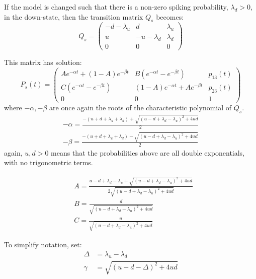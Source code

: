 If the model is changed such that there is a non-zero spiking probability, $\lambda_d>0$, in the down-state, then the transition matrix $Q_s$ becomes:
\begin{equation}
Q_s = \begin{pmatrix} -d-\lambda_u & d & \lambda_u \\ u & -u-\lambda_d & \lambda_d \\ 0 & 0 & 0 \end{pmatrix}
\end{equation}

This matrix has solution:
\begin{equation}
P_s(t) =
\begin{pmatrix}
Ae^{-\alpha t} + (1-A)e^{-\beta t} & B\left(e^{-\alpha t} - e^{-\beta t}\right) & p_{13}(t) \\
C\left(e^{-\alpha t} - e^{-\beta t}\right) & (1-A)e^{-\alpha t} + Ae^{-\beta t} & p_{23}(t)\\
0 & 0 & 1
\end{pmatrix}
\end{equation}
where $-\alpha,-\beta$ are once again the roots of the characteristic polynomial of $Q_s$.
\begin{equation}
\begin{split}
-\alpha = \frac{-(u+d+\lambda_u+\lambda_d) + \sqrt{(u-d+\lambda_d-\lambda_u)^2+4ud}}{2}\\
-\beta = \frac{-(u+d+\lambda_u+\lambda_d) - \sqrt{(u-d+\lambda_d-\lambda_u)^2+4ud}}{2}
\end{split}
\end{equation}
again, $u,d>0$ means that the probabilities above are all double exponentials, with no trigonometric terms.

\begin{equation}
\begin{split}
& A = \frac{u-d+\lambda_d-\lambda_u + \sqrt{(u-d+\lambda_d-\lambda_u)^2+4ud}}{2\sqrt{(u-d+\lambda_d-\lambda_u)^2 + 4ud}}\\
& B = \frac{d}{\sqrt{(u-d+\lambda_d-\lambda_u)^2 + 4ud}}\\
& C = \frac{u}{\sqrt{(u-d+\lambda_d-\lambda_u)^2 + 4ud}}
\end{split}
\end{equation}

To simplify notation, set:
\begin{equation}
\begin{split}
\label{dg}
\Delta &= \lambda_u - \lambda_d\\
\gamma &= \sqrt{(u-d-\Delta)^2 + 4ud}
\end{split}
\end{equation}

